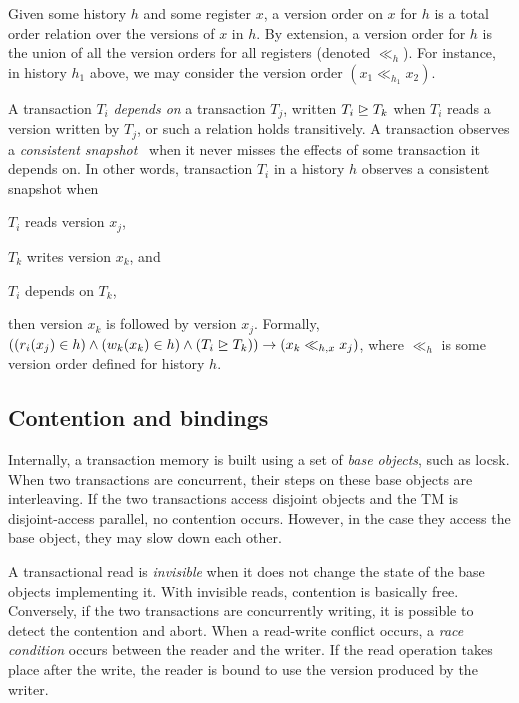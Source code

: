 Given some history $h$ and some register $x$, a version order on $x$ for $h$ is a total order relation over the versions of $x$ in $h$.
By extension, a version order for $h$ is the union of all the version orders for all registers (denoted $\ll_h$).
For instance, in history $h_1$ above,  we may consider the version order $(x_1 \ll_{h_1} x_2)$.

A transaction $T_i$ \emph{depends on} a transaction $T_j$, written $T_i \mathrel{\unrhd} T_k$ when $T_i$ reads a version written by $T_j$, or such a relation holds transitively.
A transaction observes a \emph{consistent snapshot}~\cite{chandy1985distributed} when it never misses the effects of some transaction it depends on.
In other words, transaction $T_i$ in a history $h$ observes a consistent snapshot when
\begin{inparaenum}
\item $T_i$ reads version $x_j$,
\item $T_k$ writes version $x_k$, and 
\item $T_i$ depends on $T_{k}$,
\end{inparaenum}
then version $x_k$ is followed by version $x_j$.
Formally, $((r_i(x_j) \in h) \land (w_k(x_k) \in h) \land (T_i \depends T_k)) \implies (x_k \ll_{h,x} x_j)$, where $\ll_{h}$ is some version order defined for history $h$.

\subsection{Contention and bindings}

Internally, a transaction memory is built using a set of \emph{base objects}, such as locsk.
When two transactions are concurrent, their steps on these base objects are interleaving.
If the two transactions access disjoint objects and the TM is disjoint-access parallel, no contention occurs.
However, in the case they access the base object, they may slow down each other.

A transactional read is \emph{invisible} when it does not change the state of the base objects implementing it.
With invisible reads, contention is basically free.
Conversely, if the two transactions are concurrently writing, it is possible to detect the contention and abort. %
When a read-write conflict occurs, a \emph{race condition} occurs between the reader and the writer.
If the read operation takes place after the write, the reader is bound to use the version produced by the writer.

